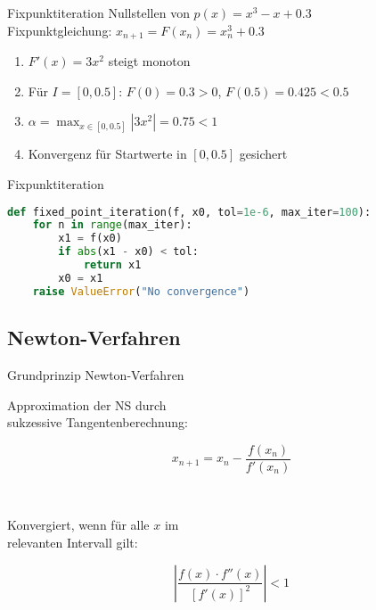 \begin{example2}{Fixpunktiteration} Nullstellen von $p(x)=x^3-x+0.3$\\
Fixpunktgleichung: $x_{n+1} = F(x_n) = x_n^3 + 0.3$
\begin{enumerate}
    \item $F'(x) = 3x^2$ steigt monoton
    \item Für $I=[0,0.5]$: $F(0)=0.3 > 0$, $F(0.5)=0.425 < 0.5$
    \item $\alpha = \max_{x \in [0,0.5]} |3x^2| = 0.75 < 1$
    \item Konvergenz für Startwerte in $[0,0.5]$ gesichert
\end{enumerate}
\end{example2}

\begin{examplecode}{Fixpunktiteration}
    \begin{lstlisting}[language=Python, style=basesmol]
def fixed_point_iteration(f, x0, tol=1e-6, max_iter=100):
    for n in range(max_iter):
        x1 = f(x0)
        if abs(x1 - x0) < tol:
            return x1
        x0 = x1
    raise ValueError("No convergence")
    \end{lstlisting}
\end{examplecode}

\subsection{Newton-Verfahren}

\begin{concept}{Grundprinzip Newton-Verfahren}
    \vspace{-2mm}\\
\begin{minipage}[t]{0.6\textwidth}
    Approximation der NS durch \\ sukzessive Tangentenberechnung:
\end{minipage}
\begin{minipage}{0.3\textwidth}
    \vspace{-3mm}
    $$x_{n+1} = x_n - \frac{f(x_n)}{f'(x_n)}$$
\end{minipage}
\vspace{-2mm}\\
\begin{minipage}[t]{0.6\textwidth}
    Konvergiert, wenn für alle $x$ im \\ relevanten Intervall gilt:
\end{minipage}
\begin{minipage}{0.3\textwidth}
    \vspace{-3mm}
    $$\left|\frac{f(x) \cdot f''(x)}{[f'(x)]^2}\right| < 1$$
\end{minipage}
\end{concept}


